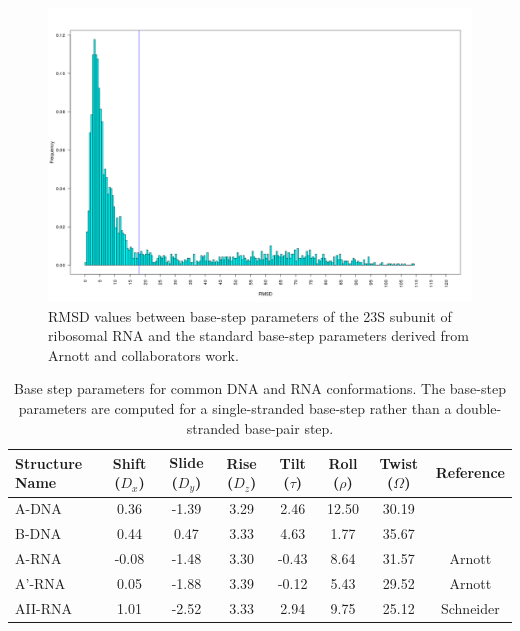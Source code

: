 \begin{figure}
 \centering
\includegraphics[angle=0, scale=0.4]{Chapter2/dormsd.png}
\caption{RMSD values between base-step parameters of the 23S subunit of
  ribosomal RNA and the standard base-step parameters derived from
  Arnott and collaborators \cite{arnott1973} work.}
 \label{fig:stability}
\end{figure}

\begin{table}[htbp]
\begin{center}
{\small
\begin{tabular}{p{2cm}|c|c|c|c|c|c|c}
\hline
\textbf{Structure Name} & Shift ($D_x$) & Slide ($D_y$) & Rise ($D_z$) & Tilt
($\tau$) & Roll ($\rho$) & Twist ($\Omega$) & \textbf{Reference} \\ \hline
A-DNA & 0.36 & -1.39 & 3.29 & 2.46 & 12.50 & 30.19 & \\ \hline
B-DNA & 0.44 & 0.47 & 3.33 & 4.63 & 1.77 & 35.67 & \\ \hline
A-RNA & -0.08 & -1.48 & 3.30 & -0.43 & 8.64 & 31.57 & Arnott \\ \hline
A'-RNA & 0.05 & -1.88 & 3.39 & -0.12 & 5.43 & 29.52 & Arnott \\ \hline
AII-RNA & 1.01 & -2.52 & 3.33 & 2.94 & 9.75 & 25.12 & Schneider \\ \hline
\end{tabular}
}
\caption{Base step parameters for common DNA and RNA
  conformations. The base-step parameters are computed for
  a single-stranded base-step rather than a double-stranded base-pair step.}
\label{tab:conformations}
\end{center}
\end{table}

